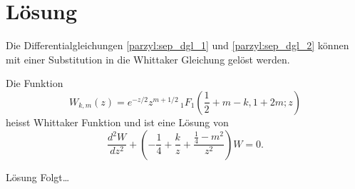 %
%
%
\section{Lösung
\label{parzyl:section:teil1}}
Die Differentialgleichungen \eqref{parzyl:sep_dgl_1} und \eqref{parzyl:sep_dgl_2} können mit einer Substitution
in die Whittaker Gleichung gelöst werden.
\begin{definition}
    Die Funktion 
    \begin{equation*}
        W_{k,m}(z) = 
    e^{-z/2} z^{m+1/2} \,
    {}_{1} F_{1}(\frac{1}{2} + m - k, 1 + 2m; z)
    \end{equation*}
    heisst Whittaker Funktion und ist eine Lösung
    von
    \begin{equation}
        \frac{d^2W}{d z^2} +
        \left(-\frac{1}{4}  + \frac{k}{z} + \frac{\frac{1}{4} - m^2}{z^2} \right) W = 0.
    \end{equation}
\end{definition}

Lösung Folgt\dots


